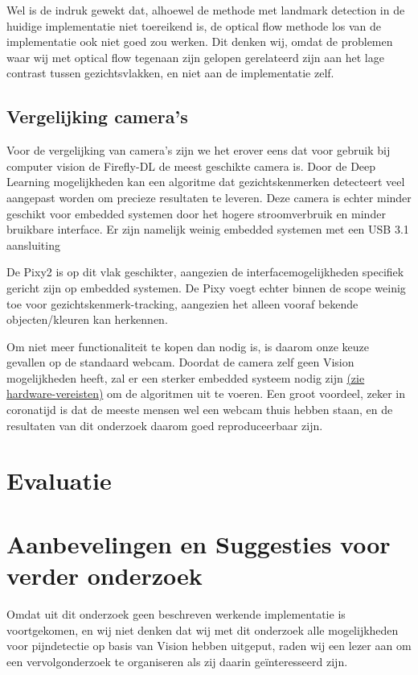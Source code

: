 \documentclass[11pt]{article}
\begin{document}
    Wel is de indruk gewekt dat, alhoewel de methode met landmark detection in de huidige implementatie niet toereikend is,
    de optical flow methode los van de implementatie ook niet goed zou werken. Dit denken wij, omdat de problemen waar wij met optical
    flow tegenaan zijn gelopen gerelateerd zijn aan het lage contrast tussen gezichtsvlakken, en niet aan de implementatie zelf.


    \subsection{Vergelijking camera's}
    Voor de vergelijking van camera's zijn we het erover eens dat voor gebruik bij computer vision de Firefly-DL de meest geschikte camera is.
    Door de Deep Learning mogelijkheden kan een algoritme dat gezichtskenmerken detecteert veel aangepast worden om precieze resultaten te leveren.
    Deze camera is echter minder geschikt voor embedded systemen door het hogere stroomverbruik en minder bruikbare interface.
    Er zijn namelijk weinig embedded systemen met een USB 3.1 aansluiting\footnotemark[3]


    De Pixy2 is op dit vlak geschikter, aangezien de interfacemogelijkheden specifiek gericht zijn op embedded systemen.
    De Pixy voegt echter binnen de scope weinig toe voor gezichtskenmerk-tracking, aangezien het alleen vooraf bekende objecten/kleuren kan herkennen.

    Om niet meer functionaliteit te kopen dan nodig is, is daarom onze keuze gevallen op de standaard webcam.
    Doordat de camera zelf geen Vision mogelijkheden heeft, zal er een sterker embedded systeem nodig zijn \hyperref[meth1-hardware]{(zie hardware-vereisten)} om de algoritmen uit te voeren.
    Een groot voordeel, zeker in coronatijd is dat de meeste mensen wel een webcam thuis hebben staan, en de resultaten van dit onderzoek daarom goed reproduceerbaar zijn.


    \section{Evaluatie}\label{sec:evaluatie2}







    \section{Aanbevelingen en Suggesties voor verder onderzoek}\label{sec:aanbevelingen2}
    Omdat uit dit onderzoek geen beschreven werkende implementatie is voortgekomen, en wij niet denken dat wij met dit onderzoek alle
    mogelijkheden voor pijndetectie op basis van Vision hebben uitgeput, raden wij een lezer
    aan om een vervolgonderzoek te organiseren als zij daarin geïnteresseerd zijn. 
\end{document}
